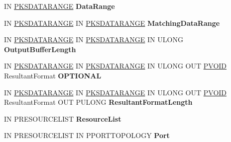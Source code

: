 \begin{DoxyCompactItemize}
\item 
\mbox{\label{class_c_c_m_i_topology_a267345f781d2af29a7e31bffd85808db}} 
IN \hyperlink{struct_k_s_d_a_t_a_f_o_r_m_a_t}{P\+K\+S\+D\+A\+T\+A\+R\+A\+N\+GE} {\bfseries Data\+Range}
\item 
\mbox{\label{class_c_c_m_i_topology_ae0b9047fae6575b6eb6513ad9afb957e}} 
IN \hyperlink{struct_k_s_d_a_t_a_f_o_r_m_a_t}{P\+K\+S\+D\+A\+T\+A\+R\+A\+N\+GE} IN \hyperlink{struct_k_s_d_a_t_a_f_o_r_m_a_t}{P\+K\+S\+D\+A\+T\+A\+R\+A\+N\+GE} {\bfseries Matching\+Data\+Range}
\item 
\mbox{\label{class_c_c_m_i_topology_a61f02b9dc1ec9c9d6707f214f7621ec6}} 
IN \hyperlink{struct_k_s_d_a_t_a_f_o_r_m_a_t}{P\+K\+S\+D\+A\+T\+A\+R\+A\+N\+GE} IN \hyperlink{struct_k_s_d_a_t_a_f_o_r_m_a_t}{P\+K\+S\+D\+A\+T\+A\+R\+A\+N\+GE} IN U\+L\+O\+NG {\bfseries Output\+Buffer\+Length}
\item 
\mbox{\label{class_c_c_m_i_topology_a016d9a8e68436b733c105c7caef83cfb}} 
IN \hyperlink{struct_k_s_d_a_t_a_f_o_r_m_a_t}{P\+K\+S\+D\+A\+T\+A\+R\+A\+N\+GE} IN \hyperlink{struct_k_s_d_a_t_a_f_o_r_m_a_t}{P\+K\+S\+D\+A\+T\+A\+R\+A\+N\+GE} IN U\+L\+O\+NG O\+UT \hyperlink{interfacevoid}{P\+V\+O\+ID} Resultant\+Format {\bfseries O\+P\+T\+I\+O\+N\+AL}
\item 
IN \hyperlink{struct_k_s_d_a_t_a_f_o_r_m_a_t}{P\+K\+S\+D\+A\+T\+A\+R\+A\+N\+GE} IN \hyperlink{struct_k_s_d_a_t_a_f_o_r_m_a_t}{P\+K\+S\+D\+A\+T\+A\+R\+A\+N\+GE} IN U\+L\+O\+NG O\+UT \hyperlink{interfacevoid}{P\+V\+O\+ID} Resultant\+Format O\+UT P\+U\+L\+O\+NG {\bfseries Resultant\+Format\+Length}
\item 
\mbox{\label{class_c_c_m_i_topology_acf110878e486b3df9f9cf39599bd94d1}} 
IN P\+R\+E\+S\+O\+U\+R\+C\+E\+L\+I\+ST {\bfseries Resource\+List}
\item 
\mbox{\label{class_c_c_m_i_topology_a77bce2ec6ad0aae93c0c9896fac06f4a}} 
IN P\+R\+E\+S\+O\+U\+R\+C\+E\+L\+I\+ST IN P\+P\+O\+R\+T\+T\+O\+P\+O\+L\+O\+GY {\bfseries Port}
\end{DoxyCompactItemize}
